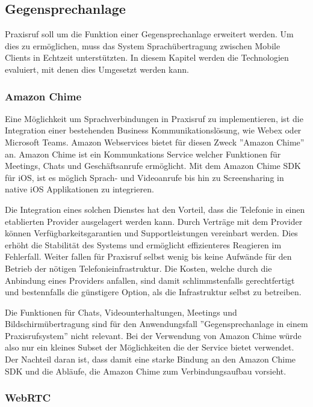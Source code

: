 \subsection{Gegensprechanlage}

Praxisruf soll um die Funktion einer Gegensprechanlage erweitert werden.
Um dies zu ermöglichen, muss das System Sprachübertragung zwischen Mobile Clients in Echtzeit unterstützten.
In diesem Kapitel werden die Technologien evaluiert, mit denen dies Umgesetzt werden kann.

\subsubsection{Amazon Chime}

Eine Möglichkeit um Sprachverbindungen in Praxisruf zu implementieren, ist die Integration einer bestehenden Business Kommunikationslösung, wie Webex oder Microsoft Teams.
Amazon Webservices bietet für diesen Zweck ''Amazon Chime'' an.
Amazon Chime ist ein Kommunkations Service welcher Funktionen für Meetings, Chats und Geschäftsanrufe ermöglicht.\cite{aws_chime}
Mit dem Amazon Chime SDK für iOS, ist es möglich Sprach- und Videoanrufe bis hin zu Screensharing in native iOS Applikationen zu integrieren.\cite{aws_chime_sdk}

Die Integration eines solchen Dienstes hat den Vorteil, dass die Telefonie in einen etablierten Provider ausgelagert werden kann.
Durch Verträge mit dem Provider können Verfügbarkeitsgarantien und Supportleistungen vereinbart werden.
Dies erhöht die Stabilität des Systems und ermöglicht effizienteres Reagieren im Fehlerfall.
Weiter fallen für Praxisruf selbst wenig bis keine Aufwände für den Betrieb der nötigen Telefonieinfrastruktur.
Die Kosten, welche durch die Anbindung eines Providers anfallen, sind damit schlimmstenfalls gerechtfertigt und bestennfalls die günstigere Option, als die Infrastruktur selbst zu betreiben.

Die Funktionen für Chats, Videounterhaltungen, Meetings und Bildschirmübertragung sind für den Anwendungsfall ''Gegensprechanlage in einem Praxisrufsystem'' nicht relevant.
Bei der Verwendung von Amazon Chime würde also nur ein kleines Subset der Möglichkeiten die der Service bietet verwendet.
Der Nachteil daran ist, dass damit eine starke Bindung an den Amazon Chime SDK und die Abläufe, die Amazon Chime zum Verbindungsaufbau vorsieht.

\subsubsection{WebRTC}

